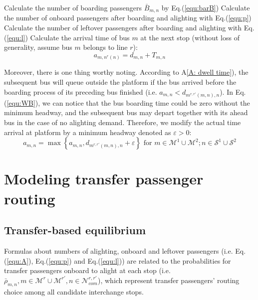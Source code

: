 \documentclass[smallextended]{svjour3}       %
\begin{document}
\begin{Abstract}
\begin{algorithm}[H]
\begin{algorithmic}
                  \STATE Calculate the number of boarding passengers $\bar{B}_{m,n}$ by Eq.(\ref{equ:barB})
                  \STATE Calculate the number of onboard passengers after boarding and alighting with Eq.(\ref{equ:p})     
                  \STATE Calculate the number of leftover passengers after boarding and alighting with Eq.(\ref{equ:l})   
                      \STATE Calculate the arrival time of bus $m$ at the next stop (without loss of generality, assume bus $m$ belongs to line $r$):
                      \begin{equation}
                          \label{equ:a}
                          a_{m,n^{r}(n)}=d_{m,n}+T_{m,n}
                      \end{equation}
                  \ENDIF

              \ENDFOR
          \ENDFOR
      \ENDFOR
  \end{algorithmic}
\end{algorithm}
Moreover, there is one thing worthy noting. 
According to A\ref{A: dwell time}), the subsequent bus will queue outside the platform
if the bus arrived before the boarding process of its preceding bus finished (i.e. $a_{m,n}<d_{m^{r,r'}(m,n),n}$). 
In \textup{Eq.(\ref{equ:WB})}, we can notice that the bus boarding time could be zero
without the minimum headway, and the subsequent bus may depart together with its ahead bus in the case of no alighting demand.
Therefore, we modify the actual time arrival at platform by a minimum headway denoted as $\varepsilon>0$: 
\begin{equation}
        a_{m,n} = \max \left\{a_{m,n},d_{m^{r,r'}(m,n),n}+\varepsilon\right\} 
        \text{ for } m\in \mathcal{M}^{1}\cup\mathcal{M}^{2};
        n\in \mathcal{S}^{1}\cup\mathcal{S}^{2}
\end{equation}

\section{Modeling transfer passenger routing}\label{Transfer passenger routing}
\subsection{Transfer-based equilibrium}\label{equilibrium}
Formulas about numbers of alighting, onboard and leftover passengers (i.e. Eq.(\ref{equ:A}), Eq.(\ref{equ:p}) and Eq.(\ref{equ:l})) 
are related to the probabilities for transfer passengers onboard to alight at each stop
(i.e. $\bar{\rho}_{m,n}, m\in\mathcal{M}^{r}\cup\mathcal{M}^{r'},n\in\mathcal{N}_{com}^{r,r'}$),
which represent transfer passengers' routing choice among all candidate interchange stops.


\end{Abstract}
\end{document}
